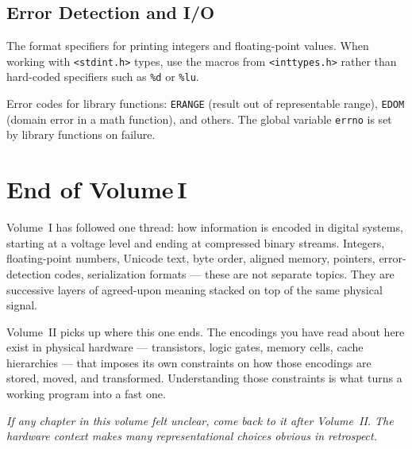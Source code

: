\section{Error Detection and I/O}

\begin{description}[leftmargin=0pt, itemsep=10pt]

\item[\texttt{<stdio.h>}]
The format specifiers for printing integers and floating-point values.
When working with \texttt{<stdint.h>} types, use the macros from
\texttt{<inttypes.h>} rather than hard-coded specifiers such as
\texttt{\%d} or \texttt{\%lu}.

\item[\texttt{<errno.h>}]
Error codes for library functions: \texttt{ERANGE} (result out of
representable range), \texttt{EDOM} (domain error in a math function),
and others. The global variable \texttt{errno} is set by library
functions on failure.

\end{description}

\backmatter
\pagestyle{backmatter}

\chapter*{End of Volume\,I}

Volume~I has followed one thread: how information is encoded in digital
systems, starting at a voltage level and ending at compressed binary
streams. Integers, floating-point numbers, Unicode text, byte order,
aligned memory, pointers, error-detection codes, serialization formats ---
these are not separate topics. They are successive layers of agreed-upon
meaning stacked on top of the same physical signal.

Volume~II picks up where this one ends. The encodings you have read about
here exist in physical hardware --- transistors, logic gates, memory cells,
cache hierarchies --- that imposes its own constraints on how those encodings
are stored, moved, and transformed. Understanding those constraints is what
turns a working program into a fast one.

\medskip
\noindent\textit{If any chapter in this volume felt unclear, come back to it
after Volume~II. The hardware context makes many representational choices
obvious in retrospect.}

\clearpage